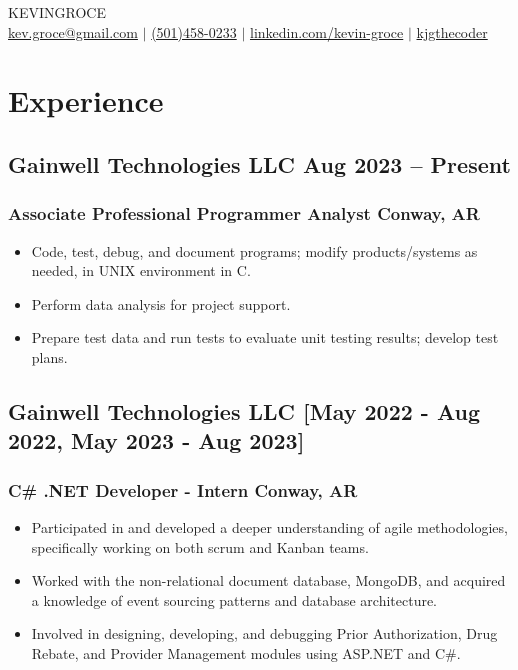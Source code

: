 \documentclass[9pt]{article}
\begin{document}
\begin{center}
    {\fontsize{30}{30}\selectfont\interthin KEVIN\interheavy GROCE} \\ \bigskip
    {\color{icnclr}\faEnvelope[regular]} \href{mailto:kev.groce@gmail.com}{kev.groce@gmail.com} 
    $|$ 
    {\color{icnclr}} \href{tel:5014580233}{(501)458-0233}
    $|$ 
    {\color{icnclr}\faLinkedinIn} \href{https://www.linkedin.com/in/kevin-groce-b90818229/}{linkedin.com/kevin-groce} 
    $|$ 
    {\color{icnclr}\faGithub} \href{https://github.com/kjgthecoder}{kjgthecoder}
\end{center}

\section{Experience}
\subsection{Gainwell Technologies LLC \hfill Aug 2023 -- Present}
\subsubsection{Associate Professional Programmer Analyst \hfill Conway, AR}
\begin{itemize}
    \item Code, test, debug, and document programs; modify products/systems as needed, in UNIX environment in C. 
    \item Perform data analysis for project support.
    \item Prepare test data and run tests to evaluate unit testing results; develop test plans.
\end{itemize}

\subsection{Gainwell Technologies LLC \hfill [May 2022 - Aug 2022, May 2023 - Aug 2023]}
\subsubsection{C\# .NET Developer - Intern \hfill Conway, AR} 
\begin{itemize}
    \item Participated in and developed a deeper understanding of agile methodologies, specifically working on both scrum and Kanban teams.
    \item Worked with the non-relational document database, MongoDB, and acquired a knowledge of event sourcing patterns and database architecture.
    \item Involved in designing, developing, and debugging Prior Authorization, Drug Rebate, and Provider Management modules using ASP.NET and C\#.
\end{itemize}
\end{document}
